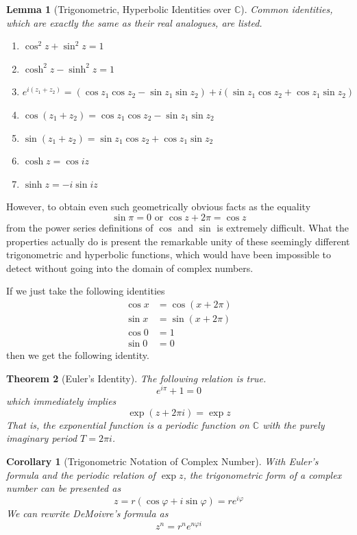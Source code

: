 \documentclass{article}
\newtheorem{theorem}{Theorem}[section]
\newtheorem{lemma}[theorem]{Lemma}
\newtheorem{corollary}{Corollary}[theorem]
\theoremstyle{remark}
\theoremstyle{definition}
\begin{document}
\begin{lemma}[Trigonometric, Hyperbolic Identities over $\mathbb{C}$]
Common identities, which are exactly the same as their real analogues, are listed. 
\begin{enumerate}
    \item $\cos^2{z} + \sin^2 {z} = 1$
    \item $\cosh^2{z} - \sinh^2{z} = 1$ 
    \item $e^{i(z_1 + z_2)} = (\cos{z_1} \cos{z_2} - \sin{z_1} \sin{z_2}) + i (\sin{z_1} \cos{z_2} + \cos{z_1} \sin{z_2})$
    \item $\cos{(z_1 + z_2)} = \cos{z_1} \cos{z_2} - \sin{z_1} \sin{z_2}$
    \item $\sin{(z_1 + z_2)} = \sin{z_1} \cos{z_2} + \cos{z_1} \sin{z_2}$
    \item $\cosh{z} = \cos{iz}$ 
    \item $\sinh{z} = -i \sin{iz}$
\end{enumerate}
\end{lemma}

However, to obtain even such geometrically obvious facts as the equality
\[\sin{\pi} = 0 \text{ or } \cos{z + 2\pi} = \cos{z}\]
from the power series definitions of $\cos$ and $\sin$ is extremely difficult. What the properties actually do is present the remarkable unity of these seemingly different trigonometric and hyperbolic functions, which would have been impossible to detect without going into the domain of complex numbers. 

If we just take the following identities
\begin{align*}
    \cos{x} & = \cos{(x + 2 \pi)} \\
    \sin{x} & = \sin{(x + 2\pi)} \\
    \cos{0} & = 1 \\
    \sin{0} & = 0
\end{align*}
then we get the following identity. 

\begin{theorem}[Euler's Identity]
The following relation is true. 
\[e^{i\pi} + 1 = 0\]
which immediately implies 
\[\exp(z + 2\pi i) = \exp{z}\]
That is, the exponential function is a periodic function on $\mathbb{C}$ with the purely imaginary period $T = 2 \pi i$. 
\end{theorem}

\begin{corollary}[Trigonometric Notation of Complex Number]
With Euler's formula and the periodic relation of $\exp{z}$, the trigonometric form of a complex number can be presented as
\[z = r(\cos{\varphi} + i \sin{\varphi}) = r e^{i \varphi}\]
We can rewrite DeMoivre's formula as
\[z^n = r^n e^{n \varphi i}\]
\end{corollary}
\end{document}
